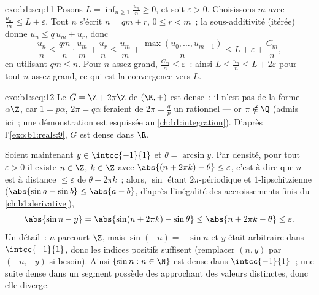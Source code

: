 \begin{solution}{exo:b1:seq:11}
Posons $L = \inf_{n \geq 1} \frac{u_n}{n} \geq 0$, et soit $\varepsilon
> 0$. Choisissons $m$ avec $\frac{u_m}{m} \leq L + \varepsilon$. Tout
$n$ s'écrit $n = qm + r$, $0 \leq r < m$~; la sous-additivité (itérée)
donne $u_n \leq q\,u_m + u_r$, donc
\[
\frac{u_n}{n} \leq \frac{q m}{n}\cdot\frac{u_m}{m} + \frac{u_r}{n}
\leq \frac{u_m}{m} + \frac{\max(u_0, \dots, u_{m-1})}{n}
\leq L + \varepsilon + \frac{C_m}{n},
\]
en utilisant $qm \leq n$. Pour $n$ assez grand, $\frac{C_m}{n} \leq
\varepsilon$~: ainsi $L \leq \frac{u_n}{n} \leq L + 2\varepsilon$ pour
tout $n$ assez grand, ce qui est la convergence vers $L$.
\end{solution}

\begin{solution}{exo:b1:seq:12}
Le  $G = \Z + 2\pi\Z$ de $(\R, +)$ est dense~: il n'est pas
de la forme $\alpha\Z$, car $1 = p\alpha$, $2\pi = q\alpha$ feraient de
$2\pi = \frac qp$ un rationnel --- or $\pi \notin \Q$ (admis ici~; une
démonstration est esquissée au \cref{ch:b1:integration}). D'après
l'\cref{exo:b1:reals:9}, $G$ est dense dans $\R$.

Soient maintenant $y \in \intcc{-1}{1}$ et $\theta = \arcsin y$. Par
densité, pour tout $\varepsilon > 0$ il existe $n \in \Z$, $k \in \Z$
avec $\abs{(n + 2\pi k) - \theta} \leq \varepsilon$, c'est-à-dire que
$n$ est à distance $\leq \varepsilon$ de $\theta - 2\pi k$~; alors,
$\sin$ étant $2\pi$-périodique et $1$-lipschitzienne ($\abs{\sin a -
\sin b} \leq \abs{a - b}$, d'après l'inégalité des accroissements
finis du \cref{ch:b1:derivative}),
\[
\abs{\sin n - y} = \abs{\sin(n + 2\pi k) - \sin\theta}
\leq \abs{n + 2\pi k - \theta} \leq \varepsilon .
\]
Un détail~: $n$ parcourt $\Z$, mais $\sin(-n) = -\sin n$ et $y$ était
arbitraire dans $\intcc{-1}{1}$, donc les indices positifs suffisent
(remplacer $(n, y)$ par $(-n, -y)$ si besoin). Ainsi $\{\sin n : n \in
\N\}$ est dense dans $\intcc{-1}{1}$~; une suite dense dans un segment
possède des  approchant des valeurs distinctes, donc
elle diverge.
\end{solution}

